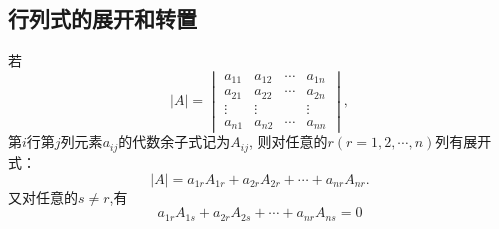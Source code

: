\subsection{行列式的展开和转置}
\begin{theorem}\label{thm:Determinant1}
  若
  \begin{equation}
    \label{eq:Determinant1}
  |A|=
  \begin{vmatrix}
    a_{11} & a_{12} & \cdots & a_{1n}\\
    a_{21} & a_{22} & \cdots & a_{2n}\\
    \vdots & \vdots & & \vdots\\
    a_{n1} & a_{n2} & \cdots & a_{nn}
  \end{vmatrix},
\end{equation}
第$i$行第$j$列元素$a_{ij}$的代数余子式记为$A_{ij}$,
则对任意的$r(r=1,2,\cdots,n)$列有展开式：
  \begin{equation}
    \label{eq:Determinant2}
    |A|=a_{1r}A_{1r}+ a_{2r}A_{2r}+\cdots+a_{nr}A_{nr}.
  \end{equation}
  又对任意的$s \neq r$,有
  \begin{equation}
    \label{eq:Determinant3}
    a_{1r}A_{1s}+a_{2r}A_{2s}+\cdots+a_{nr}A_{ns}=0
  \end{equation}
\end{theorem}


